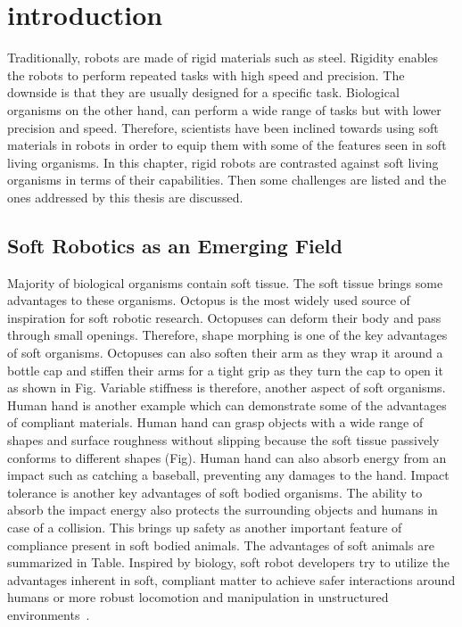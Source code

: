 \chapter{introduction}
\label{chap:intro}

Traditionally, robots are made of rigid materials such as steel. Rigidity enables the robots to perform repeated tasks with high speed and precision. The downside is that they are usually designed for a specific task. Biological organisms on the other hand, can perform a wide range of tasks but with lower precision and speed. Therefore, scientists have been inclined towards using soft materials in robots in order to equip them with some of the features seen in soft living organisms. In this chapter, rigid robots are contrasted against soft living organisms in terms of their capabilities. Then some challenges are listed and the ones addressed by this thesis are discussed. 

\section{Soft Robotics as an Emerging Field}
\label{sec:emerging}

Majority of biological organisms contain soft tissue. The soft tissue brings some advantages to these organisms. Octopus is the most widely used source of inspiration for soft robotic research. Octopuses can deform their body and pass through small openings. Therefore, shape morphing is one of the key advantages of soft organisms. Octopuses can also soften their arm as they wrap it around a bottle cap and stiffen their arms for a tight grip as they turn the cap to open it as shown in Fig. Variable stiffness is therefore, another aspect of soft organisms. Human hand is another example which can demonstrate some of the advantages of compliant materials. Human hand can grasp objects with a wide range of shapes and surface roughness without slipping because the soft tissue passively conforms to different shapes (Fig). Human hand can also absorb energy from an impact such as catching a baseball, preventing any damages to the hand. Impact tolerance is another key advantages of soft bodied organisms. The ability to absorb the impact energy also protects the surrounding objects and humans in case of a collision. This brings up safety as another important feature of compliance present in soft bodied animals. The advantages of soft animals are summarized in Table. Inspired by biology, soft robot developers try to utilize the advantages inherent in soft, compliant matter to achieve safer interactions around humans or more robust locomotion and manipulation in unstructured environments~\cite{martinez2013robotic,laschi2012soft,tolley2014resilient,bilodeau2015monolithic}.

